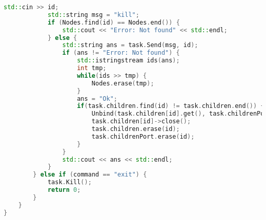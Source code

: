 \documentclass[a4paper, 12pt]{article}
\begin{document}
\begin{lstlisting}[language=C++]
            std::cin >> id;
            std::string msg = "kill";
            if (Nodes.find(id) == Nodes.end()) {
                std::cout << "Error: Not found" << std::endl;
            } else {
                std::string ans = task.Send(msg, id);
                if (ans != "Error: Not found") {
                    std::istringstream ids(ans);
                    int tmp;
                    while(ids >> tmp) {
                        Nodes.erase(tmp);
                    }
                    ans = "Ok";
                    if(task.children.find(id) != task.children.end()) {
                        Unbind(task.children[id].get(), task.childrenPort[id]);
                        task.children[id]->close();
                        task.children.erase(id);
                        task.childrenPort.erase(id);
                    }
                }
                std::cout << ans << std::endl;
            }
        } else if (command == "exit") {
            task.Kill();
            return 0;
        }
    }
}
\end{lstlisting}

\newpage
\end{document}
